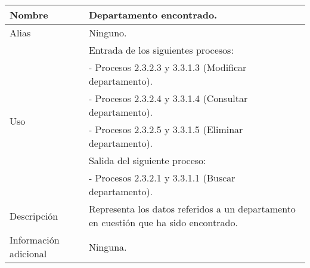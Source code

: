 \begin{center}
  \begin{tabular}{| l | p{9cm} |}
    \hline
    Nombre & \textbf{Departamento encontrado}.\\
    \hline
    Alias & Ninguno.\\
    \hline
    \multirow{6}{*}{Uso} & Entrada de los siguientes procesos:\\
                         & - Procesos 2.3.2.3 y 3.3.1.3 (Modificar departamento).\\
                         & - Procesos 2.3.2.4 y 3.3.1.4 (Consultar departamento).\\
                         & - Procesos 2.3.2.5 y 3.3.1.5 (Eliminar departamento).\\
                         & Salida del siguiente proceso:\\
                         & - Procesos 2.3.2.1 y 3.3.1.1 (Buscar departamento).\\
    \hline
    Descripción & Representa los datos referidos a un departamento en cuestión
                  que ha sido encontrado.\\
    \hline
    Información adicional & Ninguna.\\
    \hline
  \end{tabular}
\end{center}
